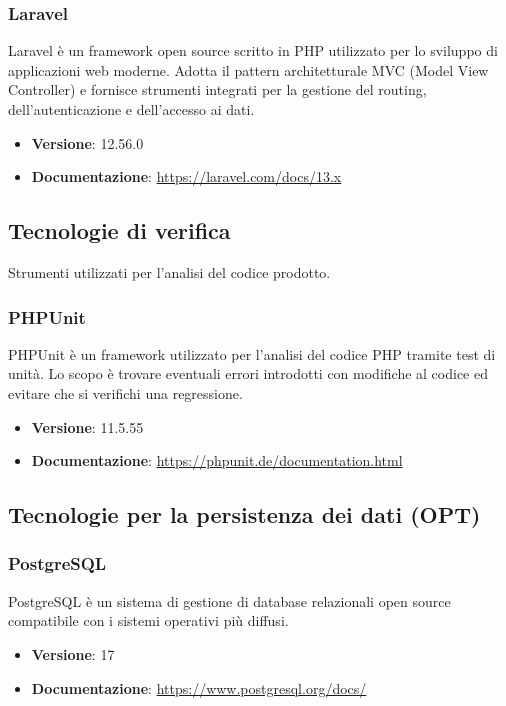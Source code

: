 \documentclass[a4paper,10pt]{article}
\begin{document}
\subsubsection{Laravel}
Laravel è un framework open source scritto in PHP utilizzato per lo sviluppo di applicazioni web moderne. Adotta il pattern architetturale MVC (Model View Controller) e fornisce strumenti integrati per la gestione del routing, dell’autenticazione e dell’accesso ai dati.
\begin{itemize}
    \item \textbf{Versione}: 12.56.0
    \item \textbf{Documentazione}: \url{https://laravel.com/docs/13.x}
\end{itemize}


\subsection{Tecnologie di verifica}
Strumenti utilizzati per l'analisi del codice prodotto.

\subsubsection{PHPUnit}
PHPUnit è un framework utilizzato per l'analisi del codice PHP tramite test di unità. Lo scopo è trovare eventuali errori introdotti con modifiche al codice ed evitare che si verifichi una regressione.
\begin{itemize}
    \item \textbf{Versione}: 11.5.55
    \item \textbf{Documentazione}: \url{https://phpunit.de/documentation.html}
\end{itemize}

\subsection{Tecnologie per la persistenza dei dati (OPT)}

\subsubsection{PostgreSQL}
PostgreSQL è un sistema di gestione di database relazionali open source compatibile con i sistemi operativi più diffusi.
\begin{itemize}
    \item \textbf{Versione}: 17
    \item \textbf{Documentazione}: \url{https://www.postgresql.org/docs/}
\end{itemize}
\end{document}
